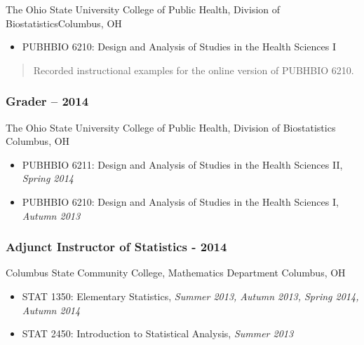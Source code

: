 \documentclass[
  fleqn, oneside]{article}
\providecommand{\tightlist}{%
  \setlength{\itemsep}{0pt}\setlength{\parskip}{0pt}}
\begin{document}
The Ohio State University College of Public Health, Division of
Biostatistics\newline Columbus, OH

\begin{itemize}
\tightlist
\item
  PUBHBIO 6210: Design and Analysis of Studies in the Health Sciences I
\end{itemize}

\begin{quote}
Recorded instructional examples for the online version of PUBHBIO 6210.
\end{quote}

\hypertarget{grader-2013-2014}{%
\subsubsection{\texorpdfstring{Grader \hfill{} --
2014}{Grader 2013 -- 2014}}\label{grader-2013-2014}}

The Ohio State University College of Public Health, Division of
Biostatistics \newline Columbus, OH

\begin{itemize}
\tightlist
\item
  PUBHBIO 6211: Design and Analysis of Studies in the Health Sciences
  II, \emph{Spring 2014}
\item
  PUBHBIO 6210: Design and Analysis of Studies in the Health Sciences I,
  \emph{Autumn 2013}
\end{itemize}

\hypertarget{adjunct-instructor-of-statistics-2013---2014}{%
\subsubsection{\texorpdfstring{Adjunct Instructor of Statistics
\hfill{} -
2014}{Adjunct Instructor of Statistics 2013 - 2014}}\label{adjunct-instructor-of-statistics-2013---2014}}

Columbus State Community College, Mathematics Department \newline
Columbus, OH

\begin{itemize}
\tightlist
\item
  STAT 1350: Elementary Statistics, \emph{Summer 2013, Autumn 2013,
  Spring 2014, Autumn 2014}
\item
  STAT 2450: Introduction to Statistical Analysis, \emph{Summer 2013}
\end{itemize}
\end{document}
